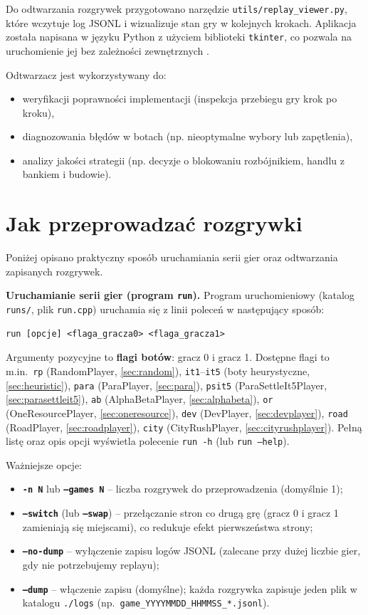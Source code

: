 \documentclass[polish,inz,longabstract]{iithesis}
\begin{document}
Do odtwarzania rozgrywek przygotowano narzędzie \texttt{utils/replay\_viewer.py}, które wczytuje log JSONL i wizualizuje stan gry w kolejnych krokach. Aplikacja została napisana w języku Python z użyciem biblioteki \texttt{tkinter}, co pozwala na uruchomienie jej bez zależności zewnętrznych \cite{12}.

Odtwarzacz jest wykorzystywany do:

\begin{itemize}
\item weryfikacji poprawności implementacji (inspekcja przebiegu gry krok po kroku),
\item diagnozowania błędów w botach (np. nieoptymalne wybory lub zapętlenia),
\item analizy jakości strategii (np. decyzje o blokowaniu rozbójnikiem, handlu z bankiem i budowie).
\end{itemize}

\section{Jak przeprowadzać rozgrywki}

Poniżej opisano praktyczny sposób uruchamiania serii gier oraz odtwarzania zapisanych rozgrywek.

\textbf{Uruchamianie serii gier (program \texttt{run}).} Program uruchomieniowy (katalog \texttt{runs/}, plik \texttt{run.cpp}) uruchamia się z linii poleceń w następujący sposób:

\begin{verbatim}
run [opcje] <flaga_gracza0> <flaga_gracza1>
\end{verbatim}

Argumenty pozycyjne to \textbf{flagi botów}: gracz 0 i gracz 1. Dostępne flagi to m.in.\ \texttt{rp} (RandomPlayer, \ref{sec:random}), \texttt{it1}--\texttt{it5} (boty heurystyczne, \ref{sec:heuristic}), \texttt{para} (ParaPlayer, \ref{sec:para}), \texttt{psit5} (ParaSettleIt5Player, \ref{sec:parasettleit5}), \texttt{ab} (AlphaBetaPlayer, \ref{sec:alphabeta}), \texttt{or} (OneResourcePlayer, \ref{sec:oneresource}), \texttt{dev} (DevPlayer, \ref{sec:devplayer}), \texttt{road} (RoadPlayer, \ref{sec:roadplayer}), \texttt{city} (CityRushPlayer, \ref{sec:cityrushplayer}). Pełną listę oraz opis opcji wyświetla polecenie \texttt{run -h} (lub \texttt{run --help}).

Ważniejsze opcje:
\begin{itemize}
\item \textbf{\texttt{-n N}} lub \textbf{\texttt{--games N}} -- liczba rozgrywek do przeprowadzenia (domyślnie 1);
\item \textbf{\texttt{--switch}} (lub \textbf{\texttt{--swap}}) -- przełączanie stron co drugą grę (gracz 0 i gracz 1 zamieniają się miejscami), co redukuje efekt pierwszeństwa strony;
\item \textbf{\texttt{--no-dump}} -- wyłączenie zapisu logów JSONL (zalecane przy dużej liczbie gier, gdy nie potrzebujemy replayu);
\item \textbf{\texttt{--dump}} -- włączenie zapisu (domyślne); każda rozgrywka zapisuje jeden plik w katalogu \texttt{./logs} (np.\ \texttt{game\_YYYYMMDD\_HHMMSS\_*.jsonl}).
\end{itemize}
\end{document}
